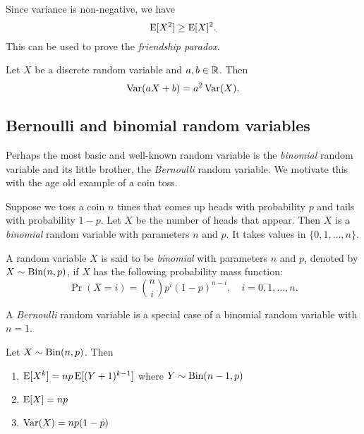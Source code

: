 \documentclass{article}
\begin{document}
\begin{remark}
  Since variance is non-negative, we have
  \[
    \operatorname{E}[X^2] \geq \operatorname{E}[X]^2.
  \]
  This can be used to prove the \emph{friendship paradox}.
\end{remark}

\begin{proposition}
  Let $X$ be a discrete random variable and $a, b \in \mathbb{R}$.
  Then
  \[
    \operatorname{Var}(a X + b) = a^2 \operatorname{Var}(X).
  \]
\end{proposition}

\subsection{Bernoulli and binomial random variables}

Perhaps the most basic and well-known random variable is the \emph{binomial} random variable and its little brother, the \emph{Bernoulli} random variable.
We motivate this with the age old example of a coin toss.

\begin{example}
  Suppose we toss a coin $n$ times that comes up heads with probability $p$ and tails with probability $1 - p$.
  Let $X$ be the number of heads that appear.
  Then $X$ is a \emph{binomial} random variable with parameters $n$ and $p$.
  It takes values in $\{0, 1, \ldots, n\}$.
\end{example}

\begin{definition}
  A random variable $X$ is said to be \emph{binomial} with parameters $n$ and $p$, denoted by $X \sim \textnormal{Bin}(n, p)$, if $X$ has the following probability mass function:
  \[
    \Pr(X = i) = \binom{n}{i} p^i (1 - p)^{n - i}, \quad i = 0, 1, \ldots, n.
  \]
\end{definition}

\begin{remark}
  A \emph{Bernoulli} random variable is a special case of a binomial random variable with $n = 1$.
\end{remark}

\begin{theorem}
  Let $X \sim \textnormal{Bin}(n, p)$.
  Then
  \begin{enumerate}
    \item $\operatorname{E}[X^k] = np \operatorname{E}[(Y + 1)^{k - 1}]$ where $Y \sim \textnormal{Bin}(n - 1, p)$
    \item $\operatorname{E}[X] = np$
    \item $\operatorname{Var}(X) = np(1 - p)$
  \end{enumerate}
\end{theorem}
\end{document}
